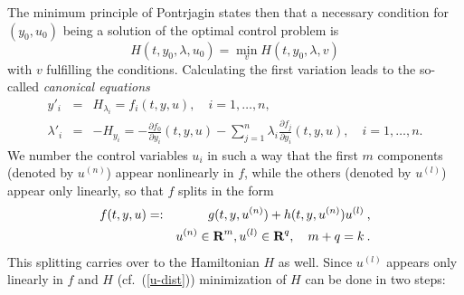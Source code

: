 \documentclass[12pt,a4paper]{article}
\newcommand{\R}{\mbox{{\sf\bf R}}}
\begin{document}
The minimum principle of Pontrjagin states then that a necessary condition for
$(y_{0}, u_{0})$ being a solution of the optimal control problem is
\begin{equation}
  H(t,y_{0},\lambda,u_{0}) = \min_{v} H(t,y_{0},\lambda,v) \label{pontrjagin}
\end{equation}
with $v$ fulfilling the conditions.  Calculating the first variation
leads to the so-called {\em canonical equations\/}
\begin{eqnarray}
  y'_{i} &=& H_{\lambda_{i}} = f_{i}(t,y,u), \quad i = 1,\ldots,n, \nonumber\\
  \lambda'_{i} &=& - H_{y_{i}} = - \frac{\partial f_{0}}{\partial y_{i}}(t,y,u)
        - \sum_{j=1}^{n} \lambda_{i}
          \frac{\partial f_{j}}{\partial y_{i}}(t,y,u), \quad i =
          1,\ldots,n.           \label{can-eqs}
\end{eqnarray}
We number the control variables $u_{i}$ in such a way that the first
$m$ components (denoted by $u^{(n)}$) appear nonlinearly in $f$, while
the others (denoted by $u^{(l)}$) appear only linearly, so that $f$
splits in the form
\begin{eqnarray}
  f(t,y,u) &=:& g(t,y,u^{(n)}) + h(t,y,u^{(n)}) u^{(l)}\:, \nonumber \\
    && u^{(n)} \in \R^{m}, u^{(l)} \in \R^{q}, \quad m+q=k \label{u-dist}\:.
\end{eqnarray}
This splitting carries over to the Hamiltonian $H$ as well.  Since
$u^{(l)}$ appears only linearly in $f$ and $H$ (cf.\ (\ref{u-dist}))
minimization of $H$ can be done in two steps:
\end{document}
